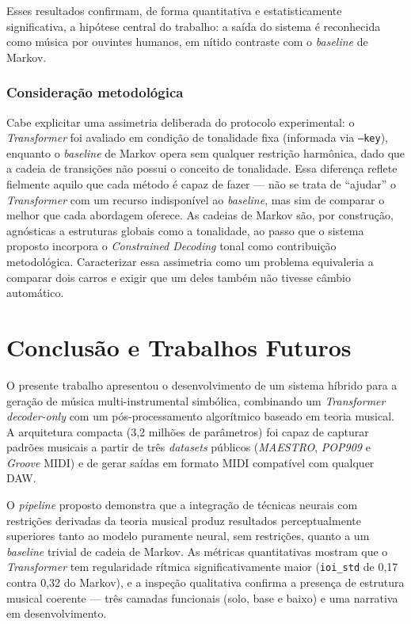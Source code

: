 \documentclass[12pt]{article}
\begin{document}
Esses resultados confirmam, de forma quantitativa e estatisticamente
significativa, a hipótese central do trabalho: a saída do sistema é reconhecida
como música por ouvintes humanos, em nítido contraste com o \emph{baseline} de
Markov.

\subsubsection{Consideração metodológica}

Cabe explicitar uma assimetria deliberada do protocolo experimental: o
\emph{Transformer} foi avaliado em condição de tonalidade fixa (informada via
\texttt{--key}), enquanto o \emph{baseline} de Markov opera sem qualquer restrição
harmônica, dado que a cadeia de transições não possui o conceito de tonalidade.
Essa diferença reflete fielmente aquilo que cada método é capaz de fazer --- não
se trata de ``ajudar'' o \emph{Transformer} com um recurso indisponível ao
\emph{baseline}, mas sim de comparar o melhor que cada abordagem oferece. As
cadeias de Markov são, por construção, agnósticas a estruturas globais como a
tonalidade, ao passo que o sistema proposto incorpora o \emph{Constrained
Decoding} tonal como contribuição metodológica. Caracterizar essa assimetria como
um problema equivaleria a comparar dois carros e exigir que um deles também não
tivesse câmbio automático.

\section{Conclusão e Trabalhos Futuros}
\label{sec:conclusao}

O presente trabalho apresentou o desenvolvimento de um sistema híbrido para a
geração de música multi-instrumental simbólica, combinando um \emph{Transformer
decoder-only} com um pós-processamento algorítmico baseado em teoria musical. A
arquitetura compacta (3,2 milhões de parâmetros) foi capaz de capturar padrões
musicais a partir de três \emph{datasets} públicos (\emph{MAESTRO}, \emph{POP909} e \emph{Groove} MIDI)
e de gerar saídas em formato MIDI compatível com qualquer DAW.

O \emph{pipeline} proposto demonstra que a integração de técnicas neurais com
restrições derivadas da teoria musical produz resultados perceptualmente
superiores tanto ao modelo puramente neural, sem restrições, quanto a um
\emph{baseline} trivial de cadeia de Markov. As métricas quantitativas mostram que
o \emph{Transformer} tem regularidade rítmica significativamente maior
(\texttt{ioi\_std} de 0,17 contra 0,32 do Markov), e a inspeção qualitativa
confirma a presença de estrutura musical coerente --- três camadas funcionais
(solo, base e baixo) e uma narrativa em desenvolvimento.
\end{document}
